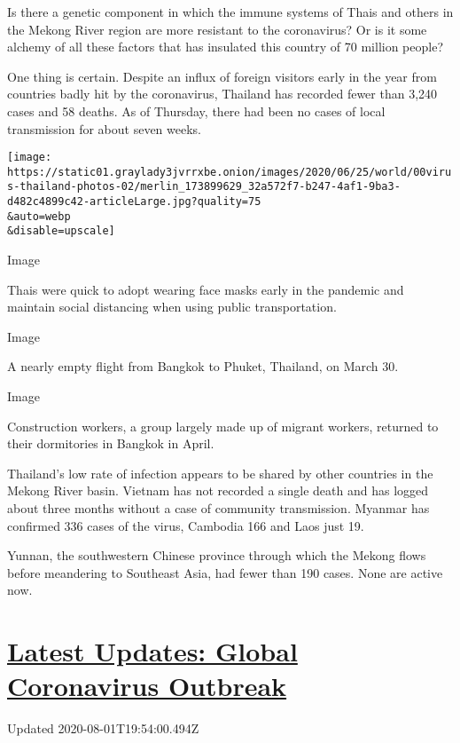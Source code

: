 Is there a genetic component in which the immune systems of Thais and
others in the Mekong River region are more resistant to the coronavirus?
Or is it some alchemy of all these factors that has insulated this
country of 70 million people?

One thing is certain. Despite an influx of foreign visitors early in the
year from countries badly hit by the coronavirus, Thailand has recorded
fewer than 3,240 cases and 58 deaths. As of Thursday, there had been no
cases of local transmission for about seven weeks.

\texttt{[image: https://static01.graylady3jvrrxbe.onion/images/2020/06/25/world/00virus-thailand-photos-02/merlin\_173899629\_32a572f7-b247-4af1-9ba3-d482c4899c42-articleLarge.jpg?quality=75\\\&auto=webp\\\&disable=upscale]}

Image

Thais were quick to adopt wearing face masks early in the pandemic and
maintain social distancing when using public transportation.~

Image

A nearly empty flight from Bangkok to Phuket, Thailand, on March 30.

Image

Construction workers, a group largely made up of migrant workers,
returned to their dormitories in Bangkok in April.

Thailand's low rate of infection appears to be shared by other countries
in the Mekong River basin. Vietnam has not recorded a single death and
has logged about three months without a case of community transmission.
Myanmar has confirmed 336 cases of the virus, Cambodia 166 and Laos just
19.

Yunnan, the southwestern Chinese province through which the Mekong flows
before meandering to Southeast Asia, had fewer than 190 cases. None are
active now.

\hypertarget{latest-updates-global-coronavirus-outbreak}{%
\section{\texorpdfstring{\href{https://www.nytimes3xbfgragh.onion/2020/08/01/world/coronavirus-covid-19.html?action=click\&pgtype=Article\&state=default\&region=MAIN_CONTENT_1\&context=storylines_live_updates}{Latest
Updates: Global Coronavirus
Outbreak}}{Latest Updates: Global Coronavirus Outbreak}}\label{latest-updates-global-coronavirus-outbreak}}

Updated 2020-08-01T19:54:00.494Z

